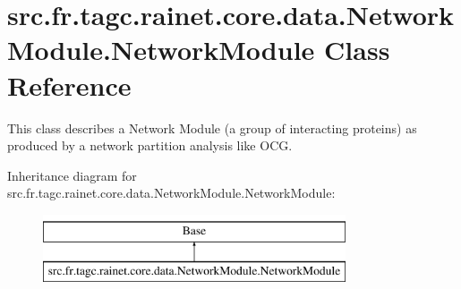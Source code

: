\hypertarget{classsrc_1_1fr_1_1tagc_1_1rainet_1_1core_1_1data_1_1NetworkModule_1_1NetworkModule}{\section{src.\-fr.\-tagc.\-rainet.\-core.\-data.\-Network\-Module.\-Network\-Module Class Reference}
\label{classsrc_1_1fr_1_1tagc_1_1rainet_1_1core_1_1data_1_1NetworkModule_1_1NetworkModule}
}


This class describes a Network Module (a group of interacting proteins) as produced by a network partition analysis like O\-C\-G.  


Inheritance diagram for src.\-fr.\-tagc.\-rainet.\-core.\-data.\-Network\-Module.\-Network\-Module\-:\begin{figure}[H]
\begin{center}
\leavevmode
\includegraphics[height=2.000000cm]{classsrc_1_1fr_1_1tagc_1_1rainet_1_1core_1_1data_1_1NetworkModule_1_1NetworkModule}
\end{center}
\end{figure}

